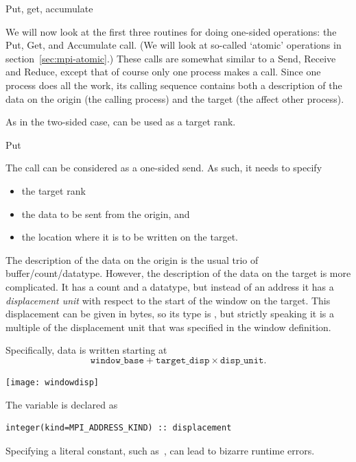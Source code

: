 
 {Put, get, accumulate}
\label{sec:putget}

We will now look at the first three routines for doing one-sided
operations: the Put, Get, and Accumulate call. (We will look at
so-called `atomic' operations in section~\ref{sec:mpi-atomic}.)
These calls are somewhat
similar to a Send, Receive and Reduce, except that of course only one
process makes a call.
Since one process does all the work, its calling sequence contains
both a description of the data on the origin (the calling process) and
the target (the affect other process).

As in the two-sided case,  can be used as
a target rank.

 {Put}

The  call can be considered as a one-sided
send. As such, it needs to specify
\begin{itemize}
\item the target rank
\item the data to be sent from the origin, and
\item the location where it is to be written on the target.
\end{itemize}

The description of the data on the origin is the usual trio of
buffer/count/datatype. However, the description of the data on the
target is more complicated. It has a count and a datatype, but instead
of an address it has a
\emph{displacement unit} with respect to the
start of the window on the target. This displacement can be given in
bytes, so its type is , but strictly speaking
it is a multiple of the displacement unit that was specified in the
window definition.

Specifically, data is written starting at
\[ \mathtt{window\_base} + \mathtt{target\_disp}\times \mathtt{disp\_unit}. \]

\texttt{[image: windowdisp]}


\begin{fortrannote}
  The  variable is declared as 
\lstset{style=reviewcode,language=Fortran} %
\begin{lstlisting}
integer(kind=MPI_ADDRESS_KIND) :: displacement
\end{lstlisting}
\lstset{style=reviewcode,language=C} %
  Specifying a literal constant, such as~, can lead to bizarre
  runtime errors.
\end{fortrannote}

